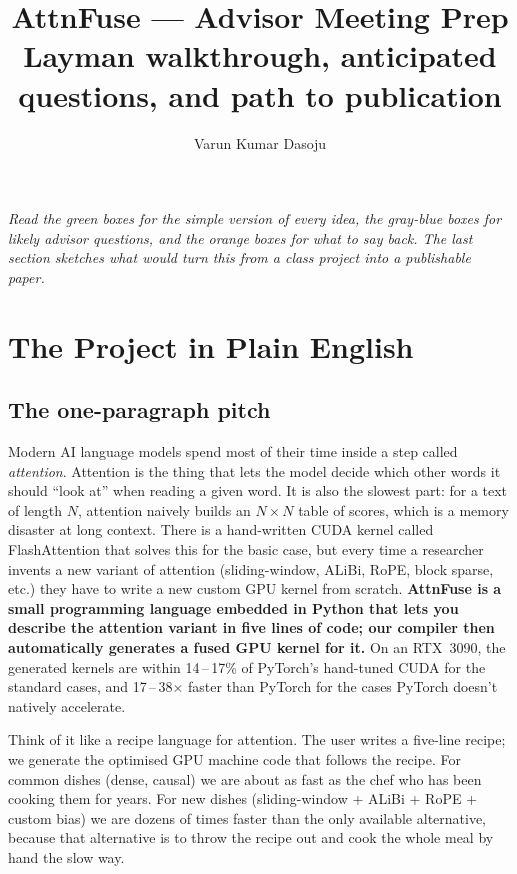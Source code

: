 \documentclass[11pt]{article}
\title{\textbf{AttnFuse — Advisor Meeting Prep}\\[4pt]
       \large Layman walkthrough, anticipated questions, and path to publication}
\author{Varun Kumar Dasoju}
\date{}
\begin{document}
\maketitle

\noindent\textit{Read the green boxes for the simple version of every idea, the
gray-blue boxes for likely advisor questions, and the orange boxes for what to
say back. The last section sketches what would turn this from a class project
into a publishable paper.}

\tableofcontents
\bigskip

\section{The Project in Plain English}

\subsection{The one-paragraph pitch}

Modern AI language models spend most of their time inside a step called
\emph{attention}. Attention is the thing that lets the model decide which
other words it should ``look at'' when reading a given word. It is also the
slowest part: for a text of length $N$, attention naively builds an $N \times N$
table of scores, which is a memory disaster at long context. There is a
hand-written CUDA kernel called FlashAttention that solves this for the basic
case, but every time a researcher invents a new variant of attention
(sliding-window, ALiBi, RoPE, block sparse, etc.) they have to write a new
custom GPU kernel from scratch. \textbf{AttnFuse is a small programming
language embedded in Python that lets you describe the attention variant in
five lines of code; our compiler then automatically generates a fused GPU
kernel for it.} On an RTX~3090, the generated kernels are within
14\,--\,17\% of PyTorch's hand-tuned CUDA for the standard cases, and
17\,--\,38$\times$ faster than PyTorch for the cases PyTorch doesn't natively
accelerate.

\begin{layman}
Think of it like a recipe language for attention. The user writes a five-line
recipe; we generate the optimised GPU machine code that follows the recipe.
For common dishes (dense, causal) we are about as fast as the chef who has
been cooking them for years. For new dishes (sliding-window + ALiBi + RoPE +
custom bias) we are dozens of times faster than the only available
alternative, because that alternative is to throw the recipe out and cook
the whole meal by hand the slow way.
\end{layman}
\end{document}
